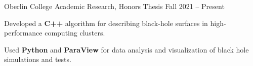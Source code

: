 \begin{entry}{Oberlin College}
	\entryItem
		{Academic Research, Honors Thesis}
		{Fall 2021 -- Present}
		
		\begin{items}
			\item Developed a \textbf{C++} algorithm for describing black-hole surfaces in high-performance computing clusters.
			\item Used \textbf{Python} and \textbf{ParaView} for data analysis and visualization of black hole simulations and tests.
		\end{items}
\end{entry}
